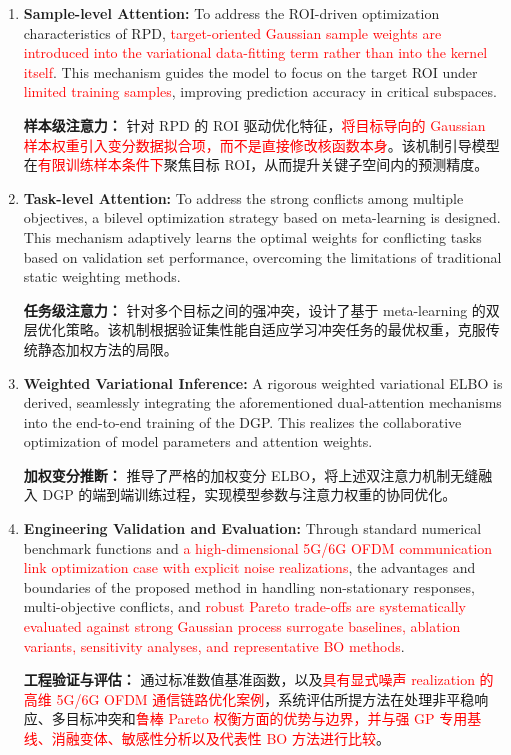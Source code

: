 \documentclass[11pt]{article}
\begin{document}
\begin{enumerate}[label=(\arabic*), wide, labelwidth=!, labelindent=0pt]
	\item \textbf{Sample-level Attention:} To address the ROI-driven optimization characteristics of RPD, \textcolor{red}{target-oriented Gaussian sample weights are introduced into the variational data-fitting term rather than into the kernel itself}. This mechanism guides the model to focus on the target ROI under \textcolor{red}{limited training samples}, improving prediction accuracy in critical subspaces.

	\textbf{样本级注意力：} 针对 RPD 的 ROI 驱动优化特征，\textcolor{red}{将目标导向的 Gaussian 样本权重引入变分数据拟合项，而不是直接修改核函数本身}。该机制引导模型在\textcolor{red}{有限训练样本条件下}聚焦目标 ROI，从而提升关键子空间内的预测精度。

	\item \textbf{Task-level Attention:} To address the strong conflicts among multiple objectives, a bilevel optimization strategy based on meta-learning is designed. This mechanism adaptively learns the optimal weights for conflicting tasks based on validation set performance, overcoming the limitations of traditional static weighting methods.

	\textbf{任务级注意力：} 针对多个目标之间的强冲突，设计了基于 meta-learning 的双层优化策略。该机制根据验证集性能自适应学习冲突任务的最优权重，克服传统静态加权方法的局限。

	\item \textbf{Weighted Variational Inference:} A rigorous weighted variational ELBO is derived, seamlessly integrating the aforementioned dual-attention mechanisms into the end-to-end training of the DGP. This realizes the collaborative optimization of model parameters and attention weights.

	\textbf{加权变分推断：} 推导了严格的加权变分 ELBO，将上述双注意力机制无缝融入 DGP 的端到端训练过程，实现模型参数与注意力权重的协同优化。

	\item \textbf{Engineering Validation and Evaluation:} Through standard numerical benchmark functions and \textcolor{red}{a high-dimensional 5G/6G OFDM communication link optimization case with explicit noise realizations}, the advantages and boundaries of the proposed method in handling non-stationary responses, multi-objective conflicts, and \textcolor{red}{robust Pareto trade-offs are systematically evaluated against strong Gaussian process surrogate baselines, ablation variants, sensitivity analyses, and representative BO methods}.

	\textbf{工程验证与评估：} 通过标准数值基准函数，以及\textcolor{red}{具有显式噪声 realization 的高维 5G/6G OFDM 通信链路优化案例}，系统评估所提方法在处理非平稳响应、多目标冲突和\textcolor{red}{鲁棒 Pareto 权衡方面的优势与边界，并与强 GP 专用基线、消融变体、敏感性分析以及代表性 BO 方法进行比较}。
\end{enumerate}
\end{document}
